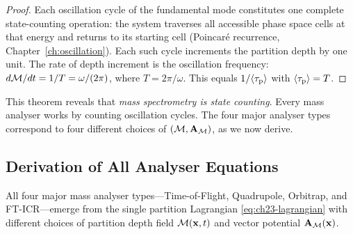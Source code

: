 \begin{proof}
Each oscillation cycle of the fundamental mode constitutes one complete
state-counting operation: the system traverses all accessible phase space
cells at that energy and returns to its starting cell (Poincar\'e recurrence,
Chapter~\ref{ch:oscillation}).  Each such cycle increments the partition depth
by one unit.  The rate of depth increment is the oscillation frequency:
$d\mathcal{M}/dt = 1/T = \omega/(2\pi)$, where $T = 2\pi/\omega$.  This equals
$1/\langle\tau_{\mathrm{p}}\rangle$ with $\langle\tau_{\mathrm{p}}\rangle = T$.
\end{proof}

This theorem reveals that \emph{mass spectrometry is state counting}.  Every
mass analyser works by counting oscillation cycles.  The four major analyser
types correspond to four different choices of $(\mathcal{M}, \mathbf{A}_{\mathcal{M}})$, as we
now derive.

\subsection{Derivation of All Analyser Equations}
\label{sec:ch23-analyzers}

\begin{theorem}
\label{thm:ch23-analyzers}
All four major mass analyser types---Time-of-Flight, Quadrupole,
Orbitrap, and FT-ICR---emerge from the single partition Lagrangian
\eqref{eq:ch23-lagrangian} with different choices of partition depth field
$\mathcal{M}(\mathbf{x}, t)$ and vector potential $\mathbf{A}_{\mathcal{M}}(\mathbf{x})$.
\end{theorem}

